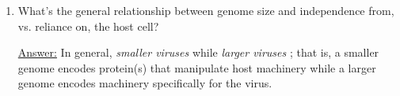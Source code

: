 \documentclass{article}
\newenvironment{QandA}{\begin{enumerate}[label=\bfseries Q\arabic*.]}
                       {\end{enumerate}}
\newenvironment{answered}{\par\normalfont\underline{Answer:}}{}
\begin{document}
\begin{QandA}
    \begin{answered}
    \begin{itemize}
      \item{\textit{Recognition}: the virus needs at least one protein to recognize its ori(s), so \textbf{origin-binding protein(s)}.}
      \item{\textit{Unwinding}: the virus needs \textbf{helicase(s)} to unwind the DNA.}
      \item{\textit{Elongation}: the virus needs \textbf{DNA polymerase(s)} for the main work of DNA synthesis.}
      \item{\textit{Chew back}: The virus also needs \textbf{exonucleases} to chew back DNA.}
      \item{\textit{Metabolism}: The virus depends on various \textbf{nucleic acid metabolic enzymes}.}
    \end{itemize}
    \end{answered}
  \item{What's the general relationship between genome size and independence from, vs. reliance on, the host cell?}
    \begin{answered}
    In general, \textit{smaller viruses } while \textit{larger viruses }; that is, a smaller genome encodes protein(s) that manipulate host machinery while a larger genome encodes machinery specifically for the virus.
    \end{answered}
\end{QandA}
\end{document}
